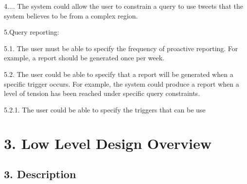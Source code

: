 4.... The system could allow the user to constrain a query to use tweets that the system believes to be from a complex region.

5.\+Query reporting\+: \begin{DoxyVerb}5.1. The user must be able to specify the frequency of proactive reporting. For example, a report should be generated once per week.    

5.2. The user could be able to specify that a report will be generated when a specific trigger occurs. For example, the system could produce a report when a level of tension has been reached under specific query constraints.    

    5.2.1. The user could be able to specify the triggers that can be use
\end{DoxyVerb}
\hypertarget{index_sec_3}{}\section{3.	\+Low Level Design Overview}\label{index_sec_3}
\hypertarget{index_sec_3_1}{}\subsection{3.	\+Description}\label{index_sec_3_1}

